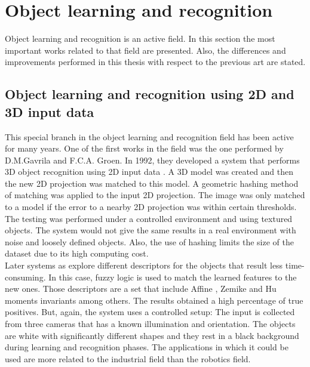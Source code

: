 \section{Object learning and recognition}

Object learning and recognition is an active field. 
In this section the most important works related to that field are presented. 
Also, the differences and improvements performed in this thesis with respect to the previous art are stated. 

\subsection{Object learning and recognition using 2D and 3D input data}

This special branch in the object learning and recognition field has been active for many years. 
One of the first works in the field was the one performed by D.M.Gavrila and F.C.A. Groen. 
In 1992,  they developed a  system that performs 3D object recognition using 2D input data \cite{D.M.Gavrila1991}.
A 3D model was created and then the new 2D projection was matched to this model.
A geometric hashing method of matching was applied to the input 2D projection. 
The image was only matched to a model if the error to a nearby 2D projection was within certain thresholds.
The testing was performed under a controlled environment and using textured objects. 
The system would not give the same results in a real environment with noise and loosely defined objects. 
Also, the use of hashing limits the size of the dataset due to its high computing cost. 
\\

Later systems as \cite{Sheta2012} explore different descriptors for the objects that result less time-consuming. 
In this case, fuzzy logic is used to match the learned features to the new ones. 
Those descriptors are a set that include Affine \cite{Reiss:1991:RFT:117668.117680}, Zemike \cite{Teague} and Hu \cite{Hu1962} moments invariants among others. 
The results obtained a high percentage of true positives. 
But, again, the system uses a controlled setup:
The input is collected from three cameras that has a known illumination and orientation. 
The objects are white with significantly different shapes and they rest in a black background during learning and recognition phases. 
The applications in which it could be used are more related to the industrial field than the robotics field. 
\\

